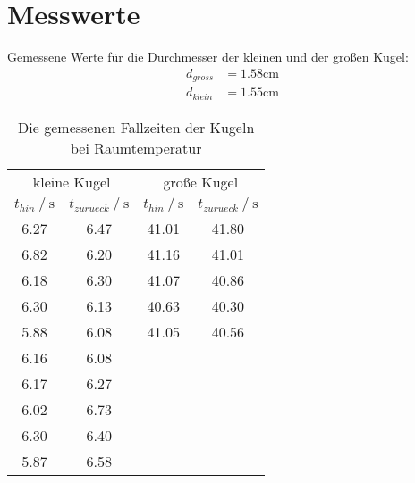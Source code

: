 \section{Messwerte}
\label{sec:Messwerte}

Gemessene Werte für die Durchmesser der kleinen und der großen Kugel:
\begin{align*}
    d_{gross} &= 1.58\unit{\centi\meter}\\
    d_{klein} &= 1.55\unit{\centi\meter}
\end{align*}

\begin{table}
    \centering
    \caption{Die gemessenen Fallzeiten der Kugeln bei Raumtemperatur}
    \begin{tabular}{cccc}
      \toprule
      \multicolumn{2}{c}{kleine Kugel} & \multicolumn{2}{c}{große Kugel} \\
      \cmidrule(lr){1-2} \cmidrule(lr){3-4}
      {$t_{hin} \mathbin{/} \unit{\second}$} &
      {$t_{zurueck} \mathbin{/} \unit{\second}$} &
      {$t_{hin} \mathbin{/} \unit{\second}$} &
      {$t_{zurueck} \mathbin{/} \unit{\second}$} \\
      \midrule
        6.27 & 6.47 & 41.01 & 41.80 \\
        6.82 & 6.20 & 41.16 & 41.01 \\
        6.18 & 6.30 & 41.07 & 40.86 \\
        6.30 & 6.13 & 40.63 & 40.30 \\
        5.88 & 6.08 & 41.05 & 40.56 \\
        6.16 & 6.08 \\
        6.17 & 6.27 \\
        6.02 & 6.73 \\
        6.30 & 6.40 \\
        5.87 & 6.58 \\
      \bottomrule
    \end{tabular}
    \label{tab:Tabelle1}
\end{table}

